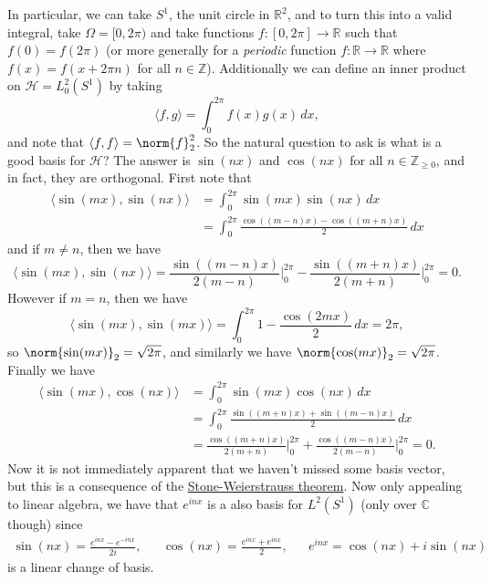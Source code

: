 In particular, we can take $S^1$, the unit circle in $\mathbb{R}^2$, and to turn this into a valid integral, take $\Omega = [0, 2\pi)$ and take functions $f \colon [0, 2\pi] \rightarrow \mathbb{R}$ such that $f(0) = f(2\pi)$ (or more generally for a \emph{periodic} function $f \colon \mathbb{R} \rightarrow \mathbb{R}$ where $f(x) = f(x + 2\pi n)$ for all $n \in \mathbb{Z}$). Additionally we can define an inner product on $\mathcal{H} = L_0^2(S^1)$ by taking
\[
\langle f, g \rangle = \int_0^{2\pi} f(x) g(x) \, dx,
\]
and note that $\langle f, f \rangle = \norm{f}_2^2$. So the natural question to ask is what is a good basis for $\mathcal{H}$? The answer is $\sin(nx)$ and $\cos(nx)$ for all $n \in \mathbb{Z}_{\geq 0}$, and in fact, they are orthogonal. First note that
\begin{align*}
\langle \sin(mx), \sin(nx) \rangle & = \int_0^{2\pi} \sin(mx) \sin(nx) \, dx
\\ & = \int_0^{2\pi} \frac{\cos((m - n)x) - \cos((m + n)x)}{2} \, dx
\end{align*}
and if $m \neq n$, then we have
\[
\langle \sin(mx), \sin(nx) \rangle = \frac{\sin((m - n)x)}{2(m - n)} \biggr\rvert_0^{2\pi} - \frac{\sin((m + n)x)}{2(m + n)} \biggr\rvert_0^{2\pi} = 0.
\]
However if $m = n$, then we have
\[
\langle \sin(mx), \sin(mx) \rangle = \int_0^{2\pi} 1 - \frac{\cos(2mx)}{2} \, dx = 2\pi,
\]
so $\norm{\sin(mx)}_2 = \sqrt{2\pi}$, and similarly we have $\norm{\cos(mx)}_2 = \sqrt{2\pi}$. Finally we have
\begin{align*}
\langle \sin(mx), \cos(nx) \rangle & = \int_0^{2\pi} \sin(mx) \cos(nx) \, dx
\\ & = \int_0^{2\pi} \frac{\sin((m+n)x) + \sin((m-n)x)}{2} \, dx
\\ & = \frac{\cos((m+n)x)}{2(m + n)} \biggr\rvert_0^{2\pi} + \frac{\cos((m-n)x)}{2(m - n)} \biggr\rvert_0^{2\pi} = 0.
\end{align*}
Now it is not immediately apparent that we haven't missed some basis vector, but this is a consequence of the \href{http://en.wikipedia.org/wiki/Stone-Weierstrass_theorem}{Stone-Weierstrauss theorem}. Now only appealing to linear algebra, we have that $e^{inx}$ is a also basis for $L^2(S^1)$ (only over $\mathbb{C}$ though) since
\begin{align*}
\sin(nx) = \frac{e^{inx} - e^{-inx}}{2i}, & & \cos(nx) = \frac{e^{inx} + e^{inx}}{2}, & & e^{inx} = \cos(nx) + i \sin(nx)
\end{align*}
is a linear change of basis.

\newpage
